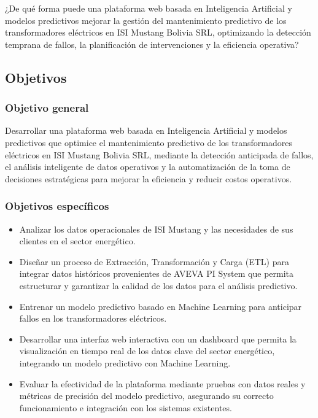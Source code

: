 \documentclass{univalle-perfil}
\begin{document}
¿De qué forma puede una plataforma web basada en Inteligencia Artificial y modelos
predictivos mejorar la gestión del mantenimiento predictivo de los transformadores
eléctricos en ISI Mustang Bolivia SRL, optimizando la detección temprana de fallos,
la planificación de intervenciones y la eficiencia operativa?

\subsection{Objetivos}

\subsubsection{Objetivo general}

Desarrollar una plataforma web basada en Inteligencia Artificial y modelos predictivos
que optimice el mantenimiento predictivo de los transformadores eléctricos en ISI
Mustang Bolivia SRL, mediante la detección anticipada de fallos, el análisis
inteligente de datos operativos y la automatización de la toma de decisiones
estratégicas para mejorar la eficiencia y reducir costos operativos.

\subsubsection{Objetivos específicos}

\begin{itemize}
    \item Analizar los datos operacionales de ISI Mustang y las necesidades de sus
    clientes en el sector energético.
    \item Diseñar un proceso de Extracción, Transformación y Carga (ETL) para
    integrar datos históricos provenientes de AVEVA PI System que permita
    estructurar y garantizar la calidad de los datos para el análisis predictivo.
    \item Entrenar un modelo predictivo basado en Machine Learning para anticipar
    fallos en los transformadores eléctricos.
    \item Desarrollar una interfaz web interactiva con un dashboard que permita la
    visualización en tiempo real de los datos clave del sector energético, integrando
    un modelo predictivo con Machine Learning.
    \item Evaluar la efectividad de la plataforma mediante pruebas con datos reales y
    métricas de precisión del modelo predictivo, asegurando su correcto
    funcionamiento e integración con los sistemas existentes.
\end{itemize}
\end{document}
